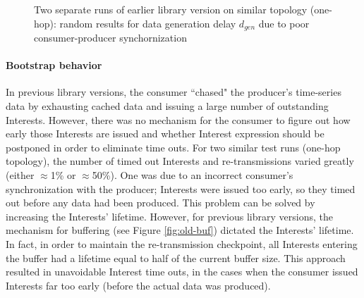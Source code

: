\documentclass{icn/sig-alternate-2012} %
\begin{document}
\begin{figure}[t!]
\centering


\caption{Two separate runs of earlier library version on similar topology (one-hop): random results for data generation delay $d_{gen}$ due to poor consumer-producer synchornization}
\label{fig:dgen}
\end{figure}

\paragraph{Bootstrap behavior} In previous library versions, the consumer ``chased" the producer's time-series data by exhausting cached data and issuing a large number of outstanding Interests. However, there was no mechanism for the consumer to figure out how early those Interests are issued and whether Interest expression should be postponed in order to eliminate time outs. For two similar test runs (one-hop topology), the number of timed out Interests and re-transmissions varied greatly (either $\approx$1\% or $\approx$50\%). One was due to an incorrect consumer's synchronization with the producer; Interests were issued too early, so they timed out before any data had been produced. This problem can be solved by increasing the Interests' lifetime. However, for previous library versions, the mechanism for buffering (see Figure \ref{fig:old-buf}) dictated the Interests' lifetime. In fact, in order to maintain the re-transmission checkpoint, all Interests entering the buffer had a lifetime equal to half of the current buffer size. This approach resulted in unavoidable Interest time outs, in the cases when the consumer issued Interests far too early (before the actual data was produced).
\end{document}
